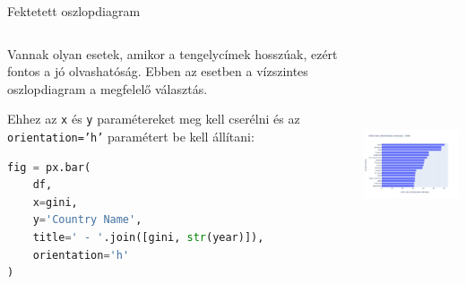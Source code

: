 \documentclass[english, aspectratio=169]{beamer}
\begin{document}
\begin{frame}[fragile]{Fektetett oszlopdiagram}
	\begin{columns}
		\begin{column}{.5\textwidth}
			Vannak olyan esetek, amikor a tengelycímek hosszúak, ezért fontos a jó olvashatóság. Ebben az esetben a vízszintes oszlopdiagram a megfelelő választás.\par\smallskip
			Ehhez az \texttt{x} és \texttt{y} paramétereket meg kell cserélni és az \texttt{orientation='h'} paramétert be kell állítani:
			\begin{lstlisting}[language=python]
fig = px.bar(
	df, 
	x=gini, 
	y='Country Name', 
	title=' - '.join([gini, str(year)]), 
	orientation='h'
)
			\end{lstlisting}
		\end{column}
		\begin{column}{.5\textwidth}
			\begin{center}
				\includegraphics[width=7cm, height=7cm, keepaspectratio]{images/plots_15.png}
			\end{center}
		\end{column}
	\end{columns}
\end{frame}
\end{document}
